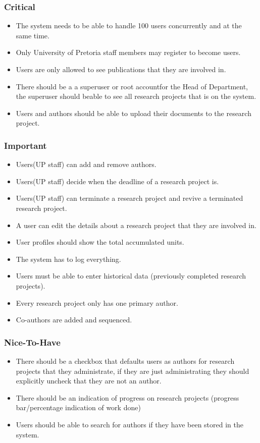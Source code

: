 \documentclass[a4paper,12pt]{report}
\begin{document}
\subsubsection{Critical}
	\begin{itemize}
		\item The system needs to be able to handle 100 users concurrently and at the same time.
		\item Only University of Pretoria staff members may register to become users.
		\item Users are only allowed to see publications that they are involved in.
		\item There should be a a superuser or root accountfor the Head of Department, the superuser should beable to see all research projects that is on the system.
		\item Users and authors should be able to upload their documents to the research project.
	\end{itemize}

\subsubsection{Important}
	\begin{itemize}
		\item Users(UP staff) can add and remove authors.
		\item Users(UP staff) decide when the deadline of a research project is.
		\item Users(UP staff) can terminate a research project and revive a terminated research project.
		\item A user can edit the details about a research project that they are involved in.
		\item User profiles should show the total accumulated units.
		\item The system has to log everything.
		\item Users must be able to enter historical data (previously completed research projects).
		\item Every research project only has one primary author.
		\item Co-authors are added and sequenced.
	\end{itemize}

\subsubsection{Nice-To-Have}
	\begin{itemize}
		\item There should be a checkbox that defaults users as authors for research projects that they administrate, if they are just administrating they should explicitly uncheck that they are not an author.
		\item There should be an indication of progress on research projects (progress bar/percentage indication of work done)
		\item Users should be able to search for authors if they have been stored in the system.
	\end{itemize}
\end{document}
